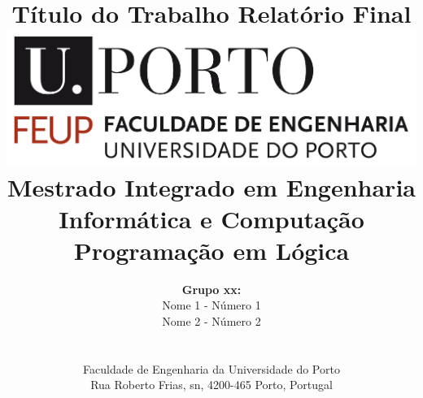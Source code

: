 \documentclass[a4paper]{article}
\begin{document}
\setlength{\textwidth}{16cm}
\setlength{\textheight}{22cm}

\title{\Huge\textbf{Título do Trabalho}\linebreak\linebreak\linebreak
\Large\textbf{Relatório Final}\linebreak\linebreak
\linebreak\linebreak
\includegraphics[scale=0.1]{feup-logo.png}\linebreak\linebreak
\linebreak\linebreak
\Large{Mestrado Integrado em Engenharia Informática e Computação} \linebreak\linebreak
\Large{Programação em Lógica}\linebreak
}

\author{\textbf{Grupo xx:}\\ Nome 1 - Número 1 \\ Nome 2 - Número 2 \\\linebreak\linebreak \\
 \\ Faculdade de Engenharia da Universidade do Porto \\ Rua Roberto Frias, s\/n, 4200-465 Porto, Portugal \linebreak\linebreak\linebreak
\linebreak\linebreak\vspace{1cm}}
\maketitle
\thispagestyle{empty}

\end{document}

